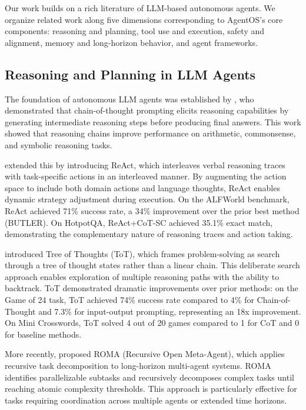 \documentclass{article}
\begin{document}
Our work builds on a rich literature of LLM-based autonomous agents. We organize related work along five dimensions corresponding to AgentOS's core components: reasoning and planning, tool use and execution, safety and alignment, memory and long-horizon behavior, and agent frameworks.

\subsection{Reasoning and Planning in LLM Agents}

The foundation of autonomous LLM agents was established by \citet{wei2022chain}, who demonstrated that chain-of-thought prompting elicits reasoning capabilities by generating intermediate reasoning steps before producing final answers. This work showed that reasoning chains improve performance on arithmetic, commonsense, and symbolic reasoning tasks.

\citet{yao2022react} extended this by introducing ReAct, which interleaves verbal reasoning traces with task-specific actions in an interleaved manner. By augmenting the action space to include both domain actions and language thoughts, ReAct enables dynamic strategy adjustment during execution. On the ALFWorld benchmark, ReAct achieved 71\% success rate, a 34\% improvement over the prior best method (BUTLER). On HotpotQA, ReAct+CoT-SC achieved 35.1\% exact match, demonstrating the complementary nature of reasoning traces and action taking.

\citet{yao2023tree} introduced Tree of Thoughts (ToT), which frames problem-solving as search through a tree of thought states rather than a linear chain. This deliberate search approach enables exploration of multiple reasoning paths with the ability to backtrack. ToT demonstrated dramatic improvements over prior methods: on the Game of 24 task, ToT achieved 74\% success rate compared to 4\% for Chain-of-Thought and 7.3\% for input-output prompting, representing an 18x improvement. On Mini Crosswords, ToT solved 4 out of 20 games compared to 1 for CoT and 0 for baseline methods.

More recently, \citet{rom2026} proposed ROMA (Recursive Open Meta-Agent), which applies recursive task decomposition to long-horizon multi-agent systems. ROMA identifies parallelizable subtasks and recursively decomposes complex tasks until reaching atomic complexity thresholds. This approach is particularly effective for tasks requiring coordination across multiple agents or extended time horizons.
\end{document}
